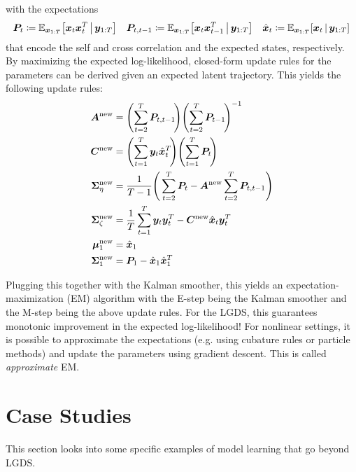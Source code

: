 			with the expectations
			\begin{align*}
				\bm{P}_t \coloneqq \mathbb{E}_{\bm{x}_{1:T}}\big[ \bm{x}_t \bm{x}_t^T \,\big\vert\, \bm{y}_{1:T} \big]
				&&
				\bm{P}_{t, t - 1} \coloneqq \mathbb{E}_{\bm{x}_{1:T}}\big[ \bm{x}_t \bm{x}_{t - 1}^T \,\big\vert\, \bm{y}_{1:T} \big]
				&&
				\hat{\bm{x}}_t \coloneqq \mathbb{E}_{\bm{x}_{1:T}}[ \bm{x}_t \,\vert\, \bm{y}_{1:T} ]
			\end{align*}
			that encode the self and cross correlation and the expected states, respectively. By maximizing the expected log-likelihood, closed-form update rules for the parameters can be derived given an expected latent trajectory. This yields the following update rules:
			\begin{align*}
				\mat{A}^\mathrm{new} &= \Bigg(\! \sum_{t = 2}^{T} \mat{P}_{t, t - 1} \!\Bigg) \Bigg(\! \sum_{t = 2}^{T} \mat{P}_{t - 1} \!\Bigg)^{-1} \\
				\mat{C}^\mathrm{new} &= \Bigg(\! \sum_{t = 1}^{T} \vec{y}_t \hat{\vec{x}}_t^T \!\Bigg) \Bigg(\! \sum_{t = 1}^{T} \mat{P}_t \!\Bigg) \\
				\mat{\Sigma}_\eta^\mathrm{new} &= \frac{1}{T - 1} \Bigg( \sum_{t = 2}^{T} \mat{P}_t - \mat{A}^\mathrm{new} \sum_{t = 2}^{T} \mat{P}_{t, t - 1} \Bigg) \\
				\mat{\Sigma}_\zeta^\mathrm{new} &= \frac{1}{T} \sum_{t = 1}^{T} \vec{y}_t \vec{y}_t^T - \mat{C}^\mathrm{new} \hat{\vec{x}}_t \vec{y}_t^T \\
				\vec{\mu}_1^\mathrm{new} &= \hat{\vec{x}}_1 \\
				\mat{\Sigma}_1^\mathrm{new} &= \mat{P}_1 - \hat{\vec{x}}_1 \hat{\vec{x}}_1^T
			\end{align*}

			Plugging this together with the Kalman smoother, this yields an expectation-maximization (EM) algorithm with the E-step being the Kalman smoother and the M-step being the above update rules. For the LGDS, this guarantees monotonic improvement in the expected log-likelihood! For nonlinear settings, it is possible to approximate the expectations (e.g. using cubature rules or particle methods) and update the parameters using gradient descent. This is called \emph{approximate} EM.

	\section{Case Studies}
		This section looks into some specific examples of model learning that go beyond LGDS.

